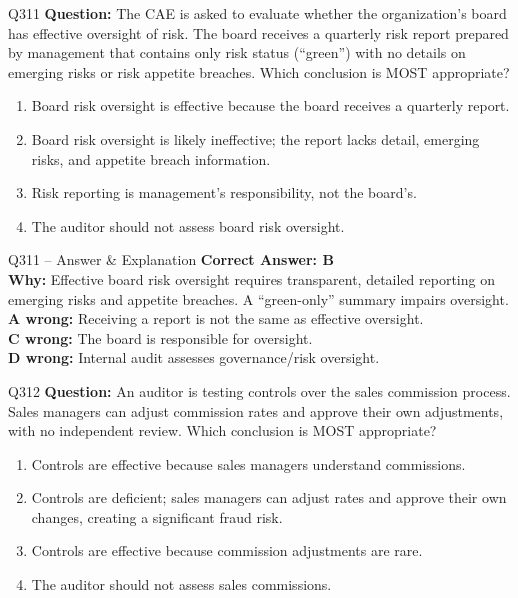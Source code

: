 \documentclass[aspectratio=169,10pt]{beamer}
\begin{document}
	\begin{frame}[t]{Q311}
		\small
		\textbf{Question:} The CAE is asked to evaluate whether the organization's board has effective oversight of risk. The board receives a quarterly risk report prepared by management that contains only risk status (``green'') with no details on emerging risks or risk appetite breaches. Which conclusion is MOST appropriate?
		\begin{enumerate}[label=\Alph*.,itemsep=1pt,topsep=2pt]
			\item Board risk oversight is effective because the board receives a quarterly report.
			\item Board risk oversight is likely ineffective; the report lacks detail, emerging risks, and appetite breach information.
			\item Risk reporting is management's responsibility, not the board's.
			\item The auditor should not assess board risk oversight.
		\end{enumerate}
	\end{frame}
	
	\begin{frame}[t]{Q311 -- Answer \& Explanation}
		\small
		\textbf{Correct Answer: B} \\[4pt]
		\textbf{Why:} Effective board risk oversight requires transparent, detailed reporting on emerging risks and appetite breaches. A ``green-only'' summary impairs oversight. \\[4pt]
		\textbf{A wrong:} Receiving a report is not the same as effective oversight. \\[2pt]
		\textbf{C wrong:} The board is responsible for oversight. \\[2pt]
		\textbf{D wrong:} Internal audit assesses governance/risk oversight.
	\end{frame}
	
	\begin{frame}[t]{Q312}
		\small
		\textbf{Question:} An auditor is testing controls over the sales commission process. Sales managers can adjust commission rates and approve their own adjustments, with no independent review. Which conclusion is MOST appropriate?
		\begin{enumerate}[label=\Alph*.,itemsep=1pt,topsep=2pt]
			\item Controls are effective because sales managers understand commissions.
			\item Controls are deficient; sales managers can adjust rates and approve their own changes, creating a significant fraud risk.
			\item Controls are effective because commission adjustments are rare.
			\item The auditor should not assess sales commissions.
		\end{enumerate}
	\end{frame}
	
\end{document}
